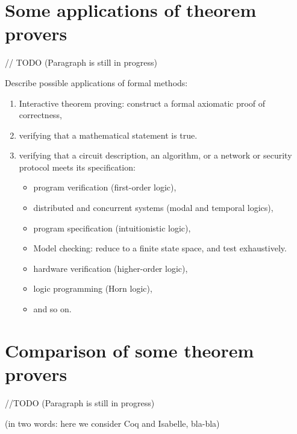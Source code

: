 \documentclass[article]{aaltoseries}
\begin{document}


\section{Some applications of theorem provers}
\label{sec:applications}

// TODO (Paragraph is still in progress) 

Describe possible applications of formal methods:
\begin{enumerate}
	\itemsep0em
	\item Interactive theorem proving: construct a formal axiomatic proof of correctness, 
	\item verifying that a mathematical statement is true.
	\item verifying that a circuit description, an algorithm, or a network or security protocol meets its specification:
	\begin{itemize}
		\item program verification (first-order logic), 
		\item distributed and concurrent systems (modal and temporal logics), 
		\item program specification (intuitionistic logic),
		\item Model checking: reduce to a finite state space, and test exhaustively.
		\item hardware verification (higher-order logic), 
		\item logic programming (Horn logic), 
		\item and so on.
	\end{itemize}
\end{enumerate}


\section{Comparison of some theorem provers}
\label{sec:comparison}

//TODO (Paragraph is still in progress) 

(in two words: here we consider Coq and Isabelle, bla-bla)

\end{document}
